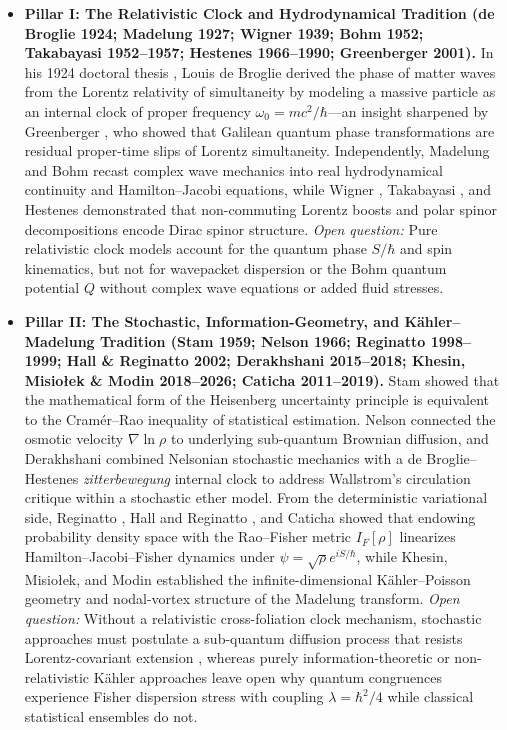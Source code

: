 \documentclass[11pt, a4paper]{article}
\theoremstyle{definition}
\begin{document}
\begin{itemize}
    \item \textbf{Pillar I: The Relativistic Clock and Hydrodynamical Tradition (de Broglie 1924; Madelung 1927; Wigner 1939; Bohm 1952; Takabayasi 1952--1957; Hestenes 1966--1990; Greenberger 2001).} In his 1924 doctoral thesis \cite{deBroglie1924}, Louis de Broglie derived the phase of matter waves from the Lorentz relativity of simultaneity by modeling a massive particle as an internal clock of proper frequency $\omega_0 = mc^2/\hbar$---an insight sharpened by Greenberger \cite{Greenberger2001}, who showed that Galilean quantum phase transformations are residual proper-time slips of Lorentz simultaneity. Independently, Madelung \cite{Madelung1927} and Bohm \cite{Bohm1952} recast complex wave mechanics into real hydrodynamical continuity and Hamilton--Jacobi equations, while Wigner \cite{Wigner1939}, Takabayasi \cite{Takabayasi1952}, and Hestenes \cite{Hestenes1990} demonstrated that non-commuting Lorentz boosts and polar spinor decompositions encode Dirac spinor structure. \textit{Open question:} Pure relativistic clock models account for the quantum phase $S/\hbar$ and spin kinematics, but not for wavepacket dispersion or the Bohm quantum potential $Q$ without complex wave equations or added fluid stresses.
    \item \textbf{Pillar II: The Stochastic, Information-Geometry, and K\"{a}hler--Madelung Tradition (Stam 1959; Nelson 1966; Reginatto 1998--1999; Hall \& Reginatto 2002; Derakhshani 2015--2018; Khesin, Misio\l{}ek \& Modin 2018--2026; Caticha 2011--2019).} Stam \cite{Stam1959} showed that the mathematical form of the Heisenberg uncertainty principle is equivalent to the Cram\'{e}r--Rao inequality of statistical estimation. Nelson \cite{Nelson1966, Nelson2012} connected the osmotic velocity $\nabla\ln\rho$ to underlying sub-quantum Brownian diffusion, and Derakhshani \cite{Derakhshani2018} combined Nelsonian stochastic mechanics with a de Broglie--Hestenes \textit{zitterbewegung} internal clock to address Wallstrom's circulation critique within a stochastic ether model. From the deterministic variational side, Reginatto \cite{Reginatto1998, Reginatto1999}, Hall and Reginatto \cite{HallReginatto2002}, and Caticha \cite{Caticha2019} showed that endowing probability density space with the Rao--Fisher metric $I_F[\rho]$ linearizes Hamilton--Jacobi--Fisher dynamics under $\psi = \sqrt{\rho}e^{iS/\hbar}$, while Khesin, Misio\l{}ek, and Modin \cite{Khesin2018, Khesin2026} established the infinite-dimensional K\"{a}hler--Poisson geometry and nodal-vortex structure of the Madelung transform. \textit{Open question:} Without a relativistic cross-foliation clock mechanism, stochastic approaches must postulate a sub-quantum diffusion process that resists Lorentz-covariant extension \cite{Gaveau1984}, whereas purely information-theoretic or non-relativistic K\"{a}hler approaches leave open why quantum congruences experience Fisher dispersion stress with coupling $\lambda = \hbar^2/4$ while classical statistical ensembles do not.
\end{itemize}
\end{document}
